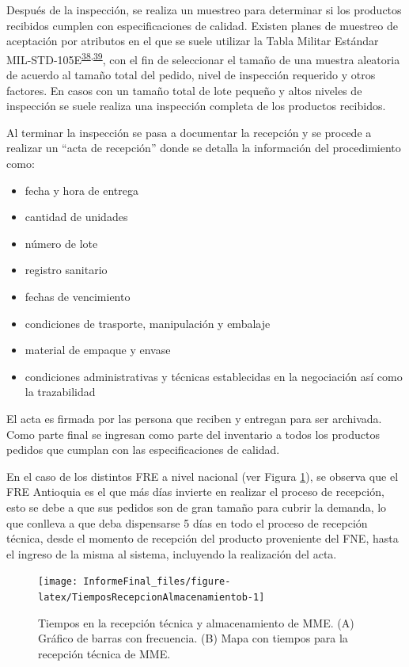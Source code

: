 \documentclass[
]{book}
\begin{document}
Después de la inspección, se realiza un muestreo para determinar si los productos recibidos cumplen con especificaciones de calidad. Existen planes de muestreo de aceptación por atributos en el que se suele utilizar la Tabla Militar Estándar MIL-STD-105E\textsuperscript{\protect\hyperlink{ref-AmericanNationalStandardsInstitute2013}{38},\protect\hyperlink{ref-GutierrezPulido2008}{39}}, con el fin de seleccionar el tamaño de una muestra aleatoria de acuerdo al tamaño total del pedido, nivel de inspección requerido y otros factores. En casos con un tamaño total de lote pequeño y altos niveles de inspección se suele realiza una inspección completa de los productos recibidos.

Al terminar la inspección se pasa a documentar la recepción y se procede a realizar un ``acta de recepción'' donde se detalla la información del procedimiento como:

\begin{itemize}
\item
  fecha y hora de entrega
\item
  cantidad de unidades
\item
  número de lote
\item
  registro sanitario
\item
  fechas de vencimiento
\item
  condiciones de trasporte, manipulación y embalaje
\item
  material de empaque y envase
\item
  condiciones administrativas y técnicas establecidas en la negociación así como la trazabilidad
\end{itemize}

El acta es firmada por las persona que reciben y entregan para ser archivada. Como parte final se ingresan como parte del inventario a todos los productos pedidos que cumplan con las especificaciones de calidad.

En el caso de los distintos FRE a nivel nacional (ver Figura \ref{fig:TiemposRecepcionAlmacenamientob}), se observa que el FRE Antioquia es el que más días invierte en realizar el proceso de recepción, esto se debe a que sus pedidos son de gran tamaño para cubrir la demanda, lo que conlleva a que deba dispensarse 5 días en todo el proceso de recepción técnica, desde el momento de recepción del producto proveniente del FNE, hasta el ingreso de la misma al sistema, incluyendo la realización del acta.

\begin{figure}

{\centering \texttt{[image: InformeFinal\_files/figure-latex/TiemposRecepcionAlmacenamientob-1]} 

}

\caption{Tiempos en la recepción técnica y almacenamiento de MME. (A) Gráfico de barras con frecuencia. (B) Mapa con tiempos para la recepción técnica de MME.}\label{fig:TiemposRecepcionAlmacenamientob}
\end{figure}
\end{document}
